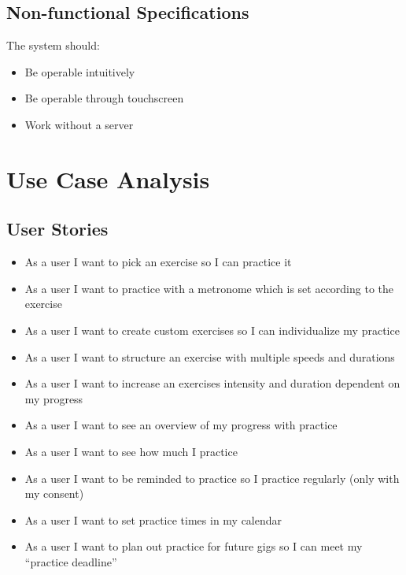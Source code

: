 \documentclass[12pt,a4paper]{report}
\begin{document}
\section{Non-functional Specifications}
The system should:
\begin{itemize}
  \item Be operable intuitively
  \item Be operable through touchscreen
  \item Work without a server
\end{itemize}

\chapter{Use Case Analysis}

\section{User Stories}

\begin{itemize}
  \item As a user I want to pick an exercise so I can practice it
  \item As a user I want to practice with a metronome which is set according to the exercise
  \item As a user I want to create custom exercises so I can individualize my practice
  \item As a user I want to structure an exercise with multiple speeds and durations
  \item As a user I want to increase an exercises intensity and duration dependent on my progress
  \item As a user I want to see an overview of my progress with practice
  \item As a user I want to see how much I practice
  \item As a user I want to be reminded to practice so I practice regularly (only with my consent)
  \item As a user I want to set practice times in my calendar
  \item As a user I want to plan out practice for future gigs so I can meet my ``practice deadline''
\end{itemize}
\end{document}
